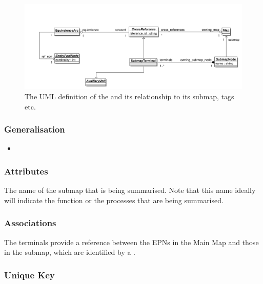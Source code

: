 \begin{figure}[htb]
  \centering
  \includegraphics[width = \textwidth]{images/submapnodeuml}
  \caption{The UML definition of the  and its
   relationship to its submap, tags etc.}
  \label{fig:techref:submapnodeuml}
\end{figure}

\subsubsection{Generalisation}

\begin{itemize}
\item {}
\end{itemize}

\subsubsection{Attributes}

\begin{attributes}
   The name of the submap that is being
  summarised. Note that this name ideally will indicate the function
  or the processes that are being summarised.
\end{attributes}

\subsubsection{Associations}

\begin{attributes}
 The terminals provide a
reference between the EPNs in the Main Map and those in the submap,
which are identified by a .
\end{attributes}

\subsubsection{Unique Key}

